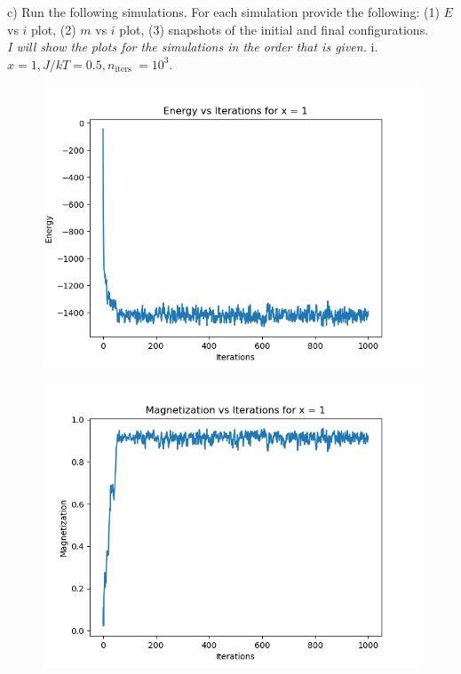 \documentclass[12pt]{article}
\begin{document}
c) Run the following simulations. For each simulation provide the following: (1) $E$ vs $i$ plot, (2) $m$ vs $i$ plot, (3) snapshots of the initial and final configurations.\\
\emph{I will show the plots for the simulations in the order that is given.}
\newpage
i. $x=1, J / k T=0.5, n_{\text {iters }}=10^{3}$.\\
\begin{figure}
  \centering
  \includegraphics[max width=\textwidth]{energy_vs_iterations_1.png}
\end{figure}
\begin{figure}
  \centering
  \includegraphics[max width=\textwidth]{magnetization_vs_iterations_1.png}
\end{figure}
\end{document}
